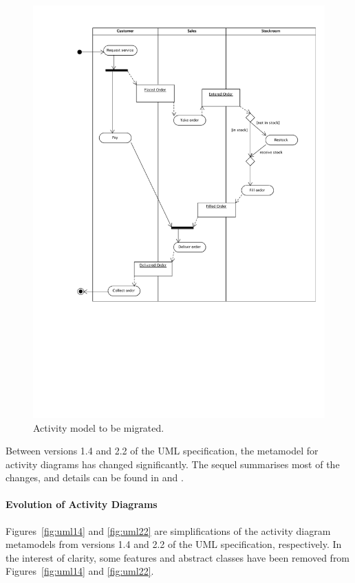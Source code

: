 \begin{figure}[htbp]
  \centering
  \includegraphics*[viewport=75 230 585 800,width=13cm]{6.Evaluation/images/activity.pdf}
  \caption{Activity model to be migrated.}
  \label{fig:activity}
\end{figure}

Between versions 1.4 and 2.2 of the UML specification, the metamodel for activity diagrams has changed significantly. The sequel summarises most of the changes, and details can be found in \cite{uml14} and \cite{uml22}.

\paragraph{Evolution of Activity Diagrams}
Figures~\ref{fig:uml14} and \ref{fig:uml22} are simplifications of the activity diagram metamodels from versions 1.4 and 2.2 of the UML specification, respectively. In the interest of clarity, some features and abstract classes have been removed from Figures~\ref{fig:uml14} and \ref{fig:uml22}.

